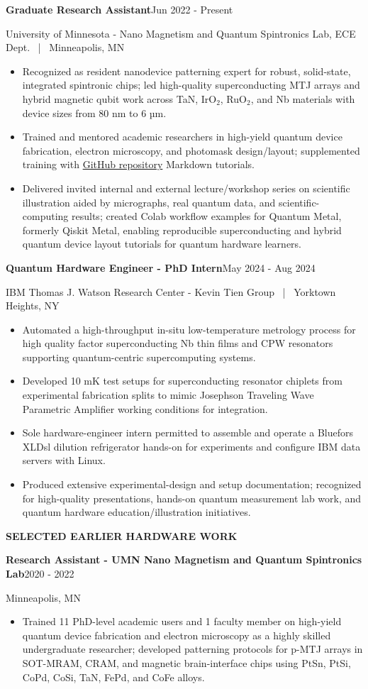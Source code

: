 \documentclass[10pt,letterpaper]{article}
\newcommand{\sectionheading}[1]{%
  \vspace{4pt}%
  {\fontsize{9.5}{10.5}\selectfont\bfseries\color{PureBlue}\MakeUppercase{#1}}\par
  \vspace{-6pt}{\color{PureBlue}\rule{\linewidth}{0.45pt}}\vspace{1pt}
}
\newcommand{\entry}[4]{%
  \textbf{#1}\hfill {\color{PureBlue}#2}\par
  {\fontsize{8.7}{10}\selectfont #3}\par
  \vspace{-2pt}#4\vspace{1pt}
}
\newenvironment{compactitems}{%
  \begin{itemize}[leftmargin=12pt,itemsep=1.0pt,topsep=1pt,parsep=0pt,partopsep=0pt]
}{%
  \end{itemize}
}
\begin{document}
\entry{Graduate Research Assistant}{Jun 2022 - Present}{University of Minnesota - Nano Magnetism and Quantum Spintronics Lab, ECE Dept. \ | \ Minneapolis, MN}{%
\begin{compactitems}
  \item Recognized as resident nanodevice patterning expert for robust, solid-state, integrated spintronic chips; led high-quality superconducting MTJ arrays and hybrid magnetic qubit work across TaN, IrO$_{2}$, RuO$_{2}$, and Nb materials with device sizes from 80 nm to 6 µm.
  \item Trained and mentored academic researchers in high-yield quantum device fabrication, electron microscopy, and photomask design/layout; supplemented training with \href{https://github.com/OJB-Quantum}{GitHub repository} Markdown tutorials.
  \item Delivered invited internal and external lecture/workshop series on scientific illustration aided by micrographs, real quantum data, and scientific-computing results; created Colab workflow examples for Quantum Metal, formerly Qiskit Metal, enabling reproducible superconducting and hybrid quantum device layout tutorials for quantum hardware learners.
\end{compactitems}}

\entry{Quantum Hardware Engineer - PhD Intern}{May 2024 - Aug 2024}{IBM Thomas J. Watson Research Center - Kevin Tien Group \ | \ Yorktown Heights, NY}{%
\begin{compactitems}
  \item Automated a high-throughput in-situ low-temperature metrology process for high quality factor superconducting Nb thin films and CPW resonators supporting quantum-centric supercomputing systems.
  \item Developed 10 mK test setups for superconducting resonator chiplets from experimental fabrication splits to mimic Josephson Traveling Wave Parametric Amplifier working conditions for integration.
  \item Sole hardware-engineer intern permitted to assemble and operate a Bluefors XLDsl dilution refrigerator hands-on for experiments and configure IBM data servers with Linux.
  \item Produced extensive experimental-design and setup documentation; recognized for high-quality presentations, hands-on quantum measurement lab work, and quantum hardware education/illustration initiatives.
\end{compactitems}}

\sectionheading{Selected Earlier Hardware Work}
\entry{Research Assistant - UMN Nano Magnetism and Quantum Spintronics Lab}{2020 - 2022}{Minneapolis, MN}{%
\begin{compactitems}
  \item Trained 11 PhD-level academic users and 1 faculty member on high-yield quantum device fabrication and electron microscopy as a highly skilled undergraduate researcher; developed patterning protocols for p-MTJ arrays in SOT-MRAM, CRAM, and magnetic brain-interface chips using PtSn, PtSi, CoPd, CoSi, TaN, FePd, and CoFe alloys.
\end{compactitems}}
\end{document}
